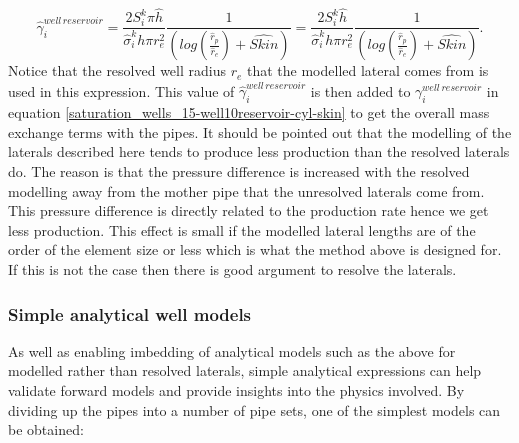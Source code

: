 \begin{equation}
\hat\gamma_{i}^{well\, reservoir}
=\frac{2 S_i^k \pi \hat{h}}{ \hat\sigma_i^k h\pi {r}_e^2} \frac{1}{ ( log(\frac{\hat{r}_p}{\hat{r}_e}) + \widehat{Skin})}
=\frac{2 S_i^k \hat{h}}{\hat\sigma_{i}^k  h\pi {r}_e^2} \frac{1}{ ( log(\frac{\hat{r}_p}{\hat{r}_e}) + \widehat{Skin})}
 .
\label{saturation_wells_15-well10reservoir-cyl-skin-model-lat}
\end{equation}
Notice that the resolved well radius ${r}_e$ that the modelled lateral comes from is used in this expression.
This value of $\hat\gamma_{i}^{well\, reservoir}$ is then added to $\gamma_{i}^{well\, reservoir}$
in equation \ref{saturation_wells_15-well10reservoir-cyl-skin} to get the overall mass exchange terms with the pipes.
It should be pointed out that the modelling of the laterals described here tends to produce less production than the resolved laterals do. The reason is that the pressure difference is increased with the resolved modelling away from the mother pipe that
the unresolved laterals come from. This pressure difference is directly related to
the production rate hence we get less production. This effect is small if the
modelled lateral lengths are of the order of the element size or less which is
what the method above is designed for. If this is not the case then there is
good argument to resolve the laterals.





\subsubsection{Simple analytical well models}
\label{Simple analytical well models}
As well as enabling imbedding of analytical models
such as the above for modelled rather than resolved laterals,
simple analytical expressions can help validate forward models and
provide insights into the physics involved.
By dividing up the pipes into a number of pipe sets, one of the simplest models can be obtained:

